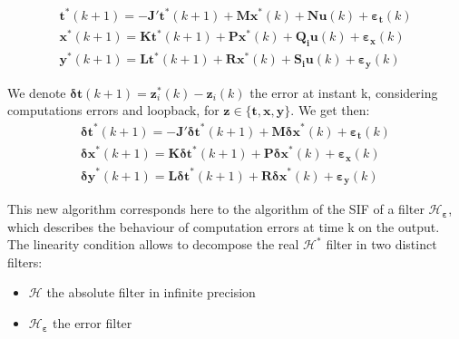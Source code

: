 			\begin{eqnarray} \label{sifalgoerr}
				\boldsymbol{t}^*(k+1) = - \boldsymbol{J'}\boldsymbol{t}^*(k+1) + \boldsymbol{M} \boldsymbol{x}^*(k) + \boldsymbol{N} \boldsymbol{u}(k) + \boldsymbol{\varepsilon_t}(k)\\
				\boldsymbol{x}^*(k+1) = \boldsymbol{K}\boldsymbol{t}^*(k+1) + \boldsymbol{P} \boldsymbol{x}^*(k) + \boldsymbol{Q_i} \boldsymbol{u}(k) + \boldsymbol{\varepsilon_x}(k) \\
				\boldsymbol{y}^*(k+1) = \boldsymbol{L}\boldsymbol{t}^*(k+1) + \boldsymbol{R} \boldsymbol{x}^*(k) + \boldsymbol{S_i} \boldsymbol{u}(k) + \boldsymbol{\varepsilon_y}(k) 
			\end{eqnarray}

			We denote $\boldsymbol{\delta t}(k+1)=\boldsymbol{z}_i^*(k)-\boldsymbol{z}_i(k)$ the error at instant k,
			considering computations errors and loopback, for $\boldsymbol{z} \in \{\boldsymbol{t},\boldsymbol{x},\boldsymbol{y}\}$.
			We get then:
			\begin{eqnarray} \label{deltaerr}
				\boldsymbol{\delta t}^*(k+1) = - \boldsymbol{J'}\boldsymbol{\delta t}^*(k+1) + \boldsymbol{M} \boldsymbol{\delta x}^*(k) + \boldsymbol{\varepsilon_t}(k)\\
				\boldsymbol{\delta x}^*(k+1) = \boldsymbol{K}\boldsymbol{\delta t}^*(k+1) + \boldsymbol{P} \boldsymbol{\delta x}^*(k) + \boldsymbol{\varepsilon_x}(k) \\
				\boldsymbol{\delta y}^*(k+1) = \boldsymbol{L}\boldsymbol{\delta t}^*(k+1) + \boldsymbol{R} \boldsymbol{\delta x}^*(k) + \boldsymbol{\varepsilon_y}(k) 
			\end{eqnarray}

			This new algorithm corresponds here to the algorithm of the SIF of a filter $\mathcal{H}_{\boldsymbol{\varepsilon}}$,
			which describes the behaviour of computation errors at time k on the output.
			The linearity condition allows to decompose the real $\mathcal{H}^*$ filter in two distinct filters:
			\begin{itemize}
				\item $\mathcal{H}$ the absolute filter in infinite precision
				\item $\mathcal{H}_{\boldsymbol{\varepsilon}}$ the error filter
			\end{itemize}

